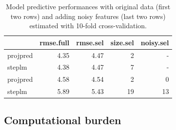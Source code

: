 \documentclass[american,]{article}
\theoremstyle{definition}
\begin{document}
\begin{table}[tp]
\scriptsize
\centering
\begin{tabular}{l|r|r|r|r}
  \hline
 & rmse.full & rmse.sel & size.sel & noisy.sel \\ 
  \hline
projpred & 4.35 & 4.47 & 2 & -  \\
steplm & 4.38 & 4.47 & 7 & - \\
\hline
\hline
projpred & 4.58 & 4.54 & 2 & 0  \\
steplm & 5.89 & 5.43 & 19 & 13 \\
   \hline
\end{tabular}
\caption{Model predictive performances with original data (first two rows) and adding noisy features (last two rows) estimated with 10-fold cross-validation.}
\label{tab:model_performances}
\end{table}


\hypertarget{computational-burden}{%
\subsection{Computational burden} \label{computational-burden}}
\end{document}
